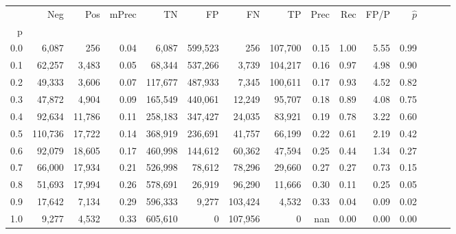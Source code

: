 \begin{tabular}{rrrrrrrrrrrrrrr}
\toprule
{} &      Neg &     Pos & mPrec &       TN &       FP &       FN &       TP &  Prec &   Rec &  FP/P & $\hat{p}$ \\
p   &          &         &       &          &          &          &          &       &       &       &           \\
\midrule
0.0 &    6,087 &     256 &  0.04 &    6,087 &  599,523 &      256 &  107,700 &  0.15 &  1.00 &  5.55 &      0.99 \\
0.1 &   62,257 &   3,483 &  0.05 &   68,344 &  537,266 &    3,739 &  104,217 &  0.16 &  0.97 &  4.98 &      0.90 \\
0.2 &   49,333 &   3,606 &  0.07 &  117,677 &  487,933 &    7,345 &  100,611 &  0.17 &  0.93 &  4.52 &      0.82 \\
0.3 &   47,872 &   4,904 &  0.09 &  165,549 &  440,061 &   12,249 &   95,707 &  0.18 &  0.89 &  4.08 &      0.75 \\
0.4 &   92,634 &  11,786 &  0.11 &  258,183 &  347,427 &   24,035 &   83,921 &  0.19 &  0.78 &  3.22 &      0.60 \\
0.5 &  110,736 &  17,722 &  0.14 &  368,919 &  236,691 &   41,757 &   66,199 &  0.22 &  0.61 &  2.19 &      0.42 \\
0.6 &   92,079 &  18,605 &  0.17 &  460,998 &  144,612 &   60,362 &   47,594 &  0.25 &  0.44 &  1.34 &      0.27 \\
0.7 &   66,000 &  17,934 &  0.21 &  526,998 &   78,612 &   78,296 &   29,660 &  0.27 &  0.27 &  0.73 &      0.15 \\
0.8 &   51,693 &  17,994 &  0.26 &  578,691 &   26,919 &   96,290 &   11,666 &  0.30 &  0.11 &  0.25 &      0.05 \\
0.9 &   17,642 &   7,134 &  0.29 &  596,333 &    9,277 &  103,424 &    4,532 &  0.33 &  0.04 &  0.09 &      0.02 \\
1.0 &    9,277 &   4,532 &  0.33 &  605,610 &        0 &  107,956 &        0 &   nan &  0.00 &  0.00 &      0.00 \\
\bottomrule
\end{tabular}
